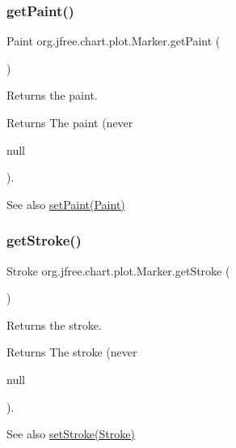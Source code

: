 \subsubsection{\texorpdfstring{get\+Paint()}{getPaint()}}
{\footnotesize\ttfamily Paint org.\+jfree.\+chart.\+plot.\+Marker.\+get\+Paint (\begin{DoxyParamCaption}{ }\end{DoxyParamCaption})}

Returns the paint.

\begin{DoxyReturn}{Returns}
The paint (never
\begin{DoxyCode}
null 
\end{DoxyCode}
 ).
\end{DoxyReturn}
\begin{DoxySeeAlso}{See also}
\mbox{\hyperlink{classorg_1_1jfree_1_1chart_1_1plot_1_1_marker_a3c4514961bdf817e6d1ce39f67209dcf}{set\+Paint(\+Paint)}} 
\end{DoxySeeAlso}
\mbox{\label{classorg_1_1jfree_1_1chart_1_1plot_1_1_marker_a43dd4fcef3afb93e3562988abb70d38b}} 
\subsubsection{\texorpdfstring{get\+Stroke()}{getStroke()}}
{\footnotesize\ttfamily Stroke org.\+jfree.\+chart.\+plot.\+Marker.\+get\+Stroke (\begin{DoxyParamCaption}{ }\end{DoxyParamCaption})}

Returns the stroke.

\begin{DoxyReturn}{Returns}
The stroke (never
\begin{DoxyCode}
null 
\end{DoxyCode}
 ).
\end{DoxyReturn}
\begin{DoxySeeAlso}{See also}
\mbox{\hyperlink{classorg_1_1jfree_1_1chart_1_1plot_1_1_marker_a2bddd459ce4410c551943204d2be7dc0}{set\+Stroke(\+Stroke)}} 
\end{DoxySeeAlso}
\mbox{\label{classorg_1_1jfree_1_1chart_1_1plot_1_1_marker_a62c5f06ab3e1267acdd958697685593b}} 
